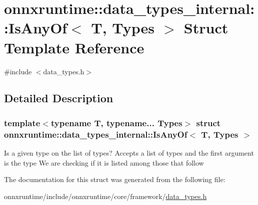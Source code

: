 \hypertarget{structonnxruntime_1_1data__types__internal_1_1IsAnyOf}{}\section{onnxruntime\+:\+:data\+\_\+types\+\_\+internal\+:\+:Is\+Any\+Of$<$ T, Types $>$ Struct Template Reference}
\label{structonnxruntime_1_1data__types__internal_1_1IsAnyOf}


{\ttfamily \#include $<$data\+\_\+types.\+h$>$}



\subsection{Detailed Description}
\subsubsection*{template$<$typename T, typename... Types$>$\newline
struct onnxruntime\+::data\+\_\+types\+\_\+internal\+::\+Is\+Any\+Of$<$ T, Types $>$}

Is a given type on the list of types? Accepts a list of types and the first argument is the type We are checking if it is listed among those that follow 

The documentation for this struct was generated from the following file\+:\begin{DoxyCompactItemize}
\item 
onnxruntime/include/onnxruntime/core/framework/\mbox{\hyperlink{data__types_8h}{data\+\_\+types.\+h}}\end{DoxyCompactItemize}
